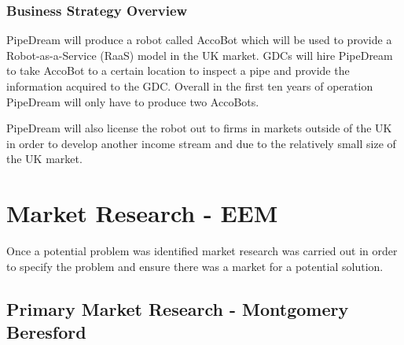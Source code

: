 \documentclass[11pt]{article}		%
\begin{document}
	\subsubsection{Business Strategy Overview}
	
	PipeDream will produce a robot called AccoBot which will be used to provide a Robot-as-a-Service (RaaS) model in the UK market. GDCs will hire PipeDream to take AccoBot to a certain location to inspect a pipe and provide the information acquired to the GDC. Overall in the first ten years of operation PipeDream will only have to produce two AccoBots.
	
	PipeDream will also license the robot out to firms in markets outside of the UK in order to develop another income stream and due to the relatively small size of the UK market.
	

    \section{Market Research - EEM}
        
        Once a potential problem was identified market research was carried out in order to specify the problem and ensure there was a market for a potential solution. 
        
        \subsection[Primary Market Research]{Primary Market Research - Montgomery Beresford}
        
\end{document}
